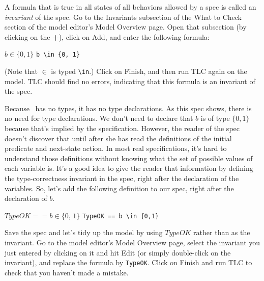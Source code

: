 A formula that is true in all states of all behaviors allowed by a
spec is called an 
\emph{invariant} of the spec.  Go to the
\textsf{Invariants} subsection of the \textsf{What to Check} section
of the model editor's \textsf{Model Overview} page.  Open
that subsection (by clicking on the {\bf \textsf{+}}), click on
\textsf{Add}, and enter the following formula:%
\begin{display}
\begin{twocols}
$b \in \{0, 1\}$
\midcol
\verb|b \in {0, 1}|
\end{twocols}
\end{display}
(Note that $\in$ is typed \verb|\in|.)  Click on \textsf{Finish}, and
then run TLC again on the model.  TLC should find no errors,
indicating that this formula is an invariant of the spec.

Because \tlaplus\ has no types, it has no type declarations.  As this
spec shows, there is no need for type declarations.  We don't need to
declare that $b$ is of type $\{0,1\}$ because that's implied by the
specification.  However, the reader of the spec doesn't discover that
until after she has read the definitions of the initial predicate and
next-state action.  In most real specifications, it's hard to
understand those definitions without knowing what the set of possible
values of each variable is.  It's a good idea to give the reader that
information by defining the 
type-correctness invariant in the spec,
right after the declaration of the variables.  So, let's add the
following definition to our spec, right after the declaration of $b$.
\begin{display}
\begin{twocols}
$TypeOK == b \in \{0,\,1\}$
\midcol
\verb|TypeOK == b \in {0,1}|
\end{twocols}
\end{display}
Save the spec and let's tidy up the model by using $TypeOK$ rather
than  as the invariant.  Go to the model
editor's \textsf{Model Overview} page, select the invariant you just
entered by clicking on it and hit \textsf{Edit} (or simply double-click on
the invariant), and replace the formula by \texttt{TypeOK}\@.  Click on
\textsf{Finish} and run TLC to check that you haven't made a mistake.

  \vspace{-\baselineskip}%
